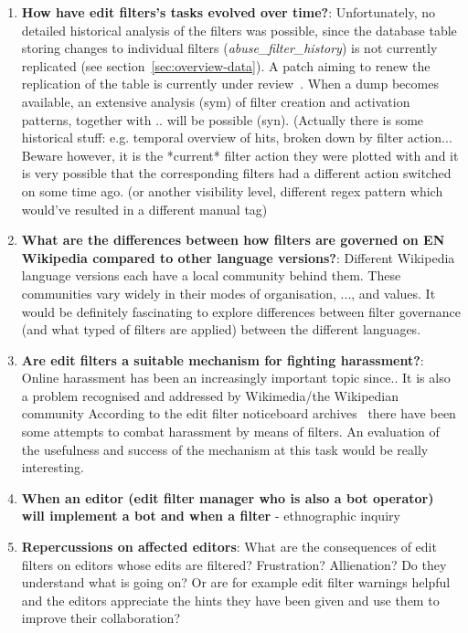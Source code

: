 \begin{enumerate}
    \item \textbf{How have edit filters's tasks evolved over time?}: Unfortunately, no detailed historical analysis of the filters was possible, since the database table storing changes to individual filters (\emph{abuse\_filter\_history}) is not currently replicated (see section~\ref{sec:overview-data}). A patch aiming to renew the replication of the table is currently under review~\cite{gerrit-tables-replication}. When a dump becomes available, an extensive analysis (sym) of filter creation and activation patterns, together with .. will be possible (syn).
        (Actually there is some historical stuff: e.g. temporal overview of hits, broken down by filter action... Beware however, it is the *current* filter action they were plotted with and it is very possible that the corresponding filters had a different action switched on some time ago. %
        (or another visibility level, different regex pattern which would've resulted in a different manual tag)
    \item \textbf{What are the differences between how filters are governed on EN Wikipedia compared to other language versions?}: Different Wikipedia language versions each have a local community behind them. %
        These communities vary widely in their modes of organisation, ..., and values. It would be definitely fascinating to explore differences between filter governance (and what typed of filters are applied) between the different languages.
    \item \textbf{Are edit filters a suitable mechanism for fighting harassment?}: Online harassment has been an increasingly important topic since.. %
        It is also a problem recognised and addressed by Wikimedia/the Wikipedian community %
        According to the edit filter noticeboard archives~\cite{Wikipedia:EditFilterNoticeboardHarassment} there have been some attempts to combat harassment by means of filters.
        An evaluation of the usefulness and success of the mechanism at this task would be really interesting.
    \item \textbf{When an editor (edit filter manager who is also a bot operator) will implement a bot and when a filter} - ethnographic inquiry
    \item \textbf{Repercussions on affected editors}: What are the consequences of edit filters on editors whose edits are filtered? Frustration? Allienation? Do they understand what is going on? Or are for example edit filter warnings helpful and the editors appreciate the hints they have been given and use them to improve their collaboration?

\end{enumerate}
